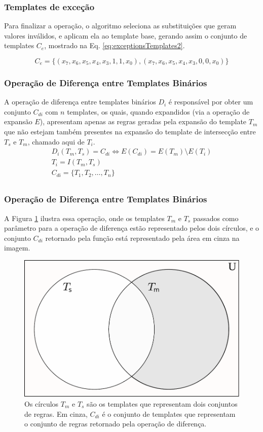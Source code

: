 \documentclass[aspectratio=43,hyperref={pdfpagelabels=false}]{beamer}
\begin{document}
 \begin{frame}
     \frametitle{Templates de exceção}
Para finalizar a operação, o algoritmo seleciona as substituições que geram valores inválidos, e aplicam ela ao template base, gerando assim o conjunto de templates $C_e$, mostrado na  Eq. \ref{eq:exceptionsTemplates2}.

\begin{equation}
C_e = \{(x_7, x_6, x_5, x_4, x_3, 1, 1, x_0),(x_7, x_6, x_5, x_4, x_3, 0, 0, x_0)\}
\label{eq:exceptionsTemplates2}
\end{equation}
 \end{frame}

  \begin{frame}
    \frametitle{Operação de Diferença entre Templates Binários}

    A operação de diferença entre templates binários $D_i$ é responsável por obter um conjunto $C_{di}$ com $n$ templates, os quais, quando expandidos (via a operação de expansão $E$), apresentam apenas as regras geradas pela expansão do template $T_m$ que não estejam também presentes na expansão do template de intersecção entre $T_s$ e $T_m$, chamado aqui de $T_i$.
    \begin{equation}
    \begin{split}
    D_i(T_m,T_s)= C_{di} \Leftrightarrow E(C_{di}) = E(T_m) \setminus E(T_i) \\
    T_i = I(T_m,T_s)\\
    C_{di} = \{T_1,T_2,\dots, T_n\}\\
    \end{split}
    \end{equation}
 \end{frame}


  \begin{frame}
    \frametitle{Operação de Diferença entre Templates Binários}
    A Figura \ref{fig:complement} ilustra essa operação, onde os templates $T_m$ e $T_s$ passados como parâmetro para a operação de diferença estão representado pelos dois círculos, e o conjunto $C_{di}$ retornado pela função está representado pela área em cinza na imagem.
    \begin{figure}[h!]
      \centering
      \includegraphics[width=.4\textwidth]{fig_complement2.pdf}
      \caption{Os círculos $T_m$ e $T_s$ são os templates que representam dois conjuntos de regras. Em cinza, $C_{di}$ é o conjunto de templates que representam o conjunto de regras retornado pela operação de diferença.}
      \label{fig:complement}
    \end{figure}
 \end{frame}
\end{document}
